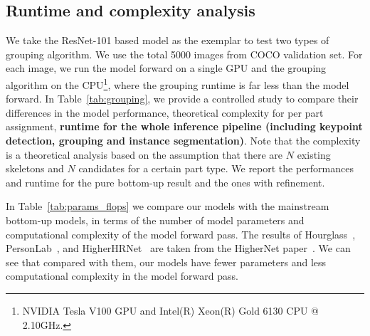 \documentclass{article} \usepackage{iclr_conference,times}
\begin{document}
\subsection{Runtime and complexity analysis} 
\label{runtime}
We take the ResNet-101 based model as the exemplar to test two types of grouping algorithm. We use the total 5000 images from COCO validation set. For each image, we run the model forward on a single GPU and the grouping algorithm on the CPU\footnote{NVIDIA Tesla V100 GPU and Intel(R) Xeon(R) Gold 6130 CPU @ 2.10GHz.}, where the grouping runtime is far less than the model forward. In Table~\ref{tab:grouping}, we provide a controlled study to compare their differences in the model performance, theoretical complexity for per part assignment, \textbf{runtime for the whole inference pipeline (including keypoint detection, grouping and instance segmentation)}. Note that the complexity is a theoretical analysis based on the assumption that there are $N$ existing skeletons and $N$ candidates for a certain part type. We report the performances and runtime for the pure bottom-up result and the ones with refinement. 

\begin{table}[h]
    \centering
    \caption{Comparison between the body-first and part-first grouping algorithm}
    \label{tab:grouping}
\end{table}

In Table~\ref{tab:params_flops} we compare our models with the mainstream bottom-up models, in terms of the number of model parameters and computational complexity of the model forward pass. The results of Hourglass~\citep{ae:newell2016associative}, PersonLab~\citep{personlab:papandreou2018personlab}, and HigherHRNet~\citep{higherhrnet:cheng2020higherhrnet} are taken from the HigherNet paper~\citep{higherhrnet:cheng2020higherhrnet}. We can see that compared with them, our models have fewer parameters and less computational complexity in the model forward pass.
\end{document}
